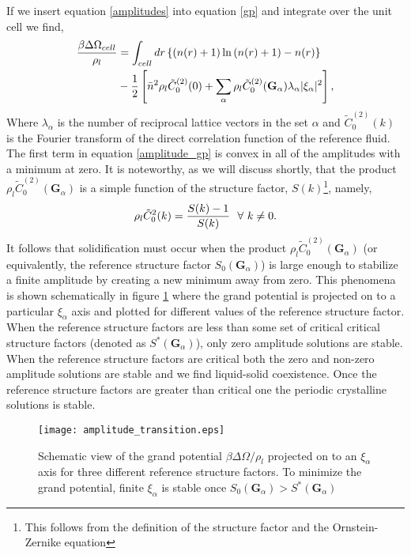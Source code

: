 If we insert equation \ref{amplitudes} into equation \ref{gp} and integrate
over the unit cell  
we find,
%
\begin{align}
    \label{amplitude_gp} 
    \frac{\beta \Delta\Omega_{cell}}{\rho_l} &=  \int_{cell} 
        dr \left\lbrace (n(r) + 1)\ln\left(n(r) + 1\right) - n(r) \right\rbrace \nonumber \\
    &- \frac{1}{2} \left[\bar{n} ^ 2 \rho_l\tilde{C}^{(2)}_0(0) + \sum_\alpha\rho_l\tilde{C}^{(2)}_0
            (\mathbf{G}_\alpha) \lambda_\alpha\vert\xi_\alpha\vert^2\right],
\end{align}
%
Where $\lambda_\alpha$ is the number of reciprocal lattice vectors in the set
$\alpha$ and $\tilde{C}^{(2)}_0(k)$ is the Fourier transform of the direct
correlation function of the reference fluid. The first term in equation
\ref{amplitude_gp} is convex in all of the amplitudes with a minimum at zero.
It is noteworthy, as we will discuss shortly, that the product $\rho_l
\tilde{C}^{(2)}_0(\mathbf{G}_\alpha)$ is a simple function of the structure
factor, $S(k)$\footnote{This follows from the definition of the structure
factor and the Ornstein-Zernike equation}, namely,
%
\begin{equation}
    \rho_l \tilde{C}_0^2(k) = \frac{S(k) - 1}{S(k)}\,\,\,\,\forall \,\,k \ne 0.
\end{equation}
%
It follows that solidification must occur when the product $\rho_l
\tilde{C}^{(2)}_0(\mathbf{G}_\alpha)$ (or equivalently, the reference structure
factor $S_0(\mathbf{G}_\alpha)$) is large enough to stabilize a
finite amplitude by creating a new minimum away from zero.  This phenomena is shown
schematically in figure \ref{fig:amplitude_transition} where the grand
potential is projected on to a particular $\xi_\alpha$ axis and plotted for
different values of the reference structure factor. When the reference
structure factors are less than some set of critical critical structure factors 
(denoted as $S^*(\mathbf{G}_\alpha)$), only zero amplitude solutions are stable. 
When the reference structure factors are critical both the zero and non-zero amplitude
solutions are stable and we find liquid-solid coexistence.  Once the reference
structure factors are greater than critical one the periodic crystalline
solutions is stable.
%
\begin{figure}
    \centering
    \texttt{[image: amplitude\_transition.eps]}
    \caption[Grand Potential through the Solidification transition]{ 
        Schematic view of the grand potential $\beta\Delta\Omega / \rho_l$
        projected on to an $\xi_\alpha$ axis for three different reference
        structure factors. To minimize the grand potential, finite $\xi_\alpha$
        is stable once $S_0(\mathbf{G}_\alpha) > S^*(\mathbf{G}_\alpha)$
    }\label{fig:amplitude_transition}
\end{figure}
